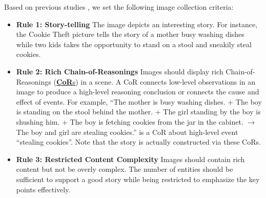 Based on previous studies \cite{describe-ctp, tasnim-etal-2022-depac}, we set the following image collection criteria: 

\begin{itemize}
    \item \textbf{Rule 1: Story-telling} The image depicts an interesting story. For instance, the Cookie Theft picture tells the story of a mother busy washing dishes while two kids takes the opportunity to stand on a stool and sneakily steal cookies.  %
    \item \textbf{Rule 2: Rich Chain-of-Reasonings} Images should display rich Chain-of-Reasonings (\underline{\textbf{CoR}s}) in a scene. 
     A CoR connects low-level observations in an image to produce a high-level reasoning conclusion or connects the cause and effect of events.
    For example, ``The mother is busy washing dishes. + The boy is standing on the stool behind the mother. + The girl standing by the boy is shushing him. + The boy is fetching cookies from the jar in the cabinet. $\rightarrow$ The boy and girl are stealing cookies.'' is a CoR about high-level event ``stealing cookies''. Note that the story is actually constructed via these CoRs.
    \item \textbf{Rule 3: Restricted Content Complexity} Images should contain rich content but not be overly complex. The number of entities should be sufficient to support a good story while being restricted to emphasize the key points effectively. 
\end{itemize}


